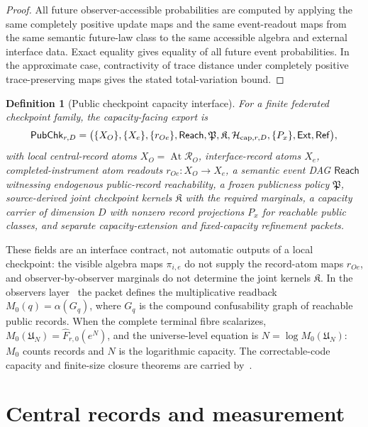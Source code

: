 \documentclass[11pt]{article}
\newtheorem{definition}[theorem]{Definition}
\theoremstyle{remark}
\theoremstyle{plain}
\begin{document}
\begin{proof}
All future observer-accessible probabilities are computed by applying the same completely
positive update maps and the same event-readout maps from the same semantic future-law class to the
same accessible algebra and external interface data. Exact equality gives equality of all future event probabilities. In the
approximate case, contractivity of trace distance under completely positive trace-preserving maps
gives the stated total-variation bound.
\end{proof}

\begin{definition}[Public checkpoint capacity interface]
\label{def:public-checkpoint-capacity-interface}
For a finite federated checkpoint family, the capacity-facing export is
\[
\mathsf{PubChk}_{r,D}=
\bigl(
\{X_O\},\{X_e\},\{r_{Oe}\},
\mathsf{Reach},\mathfrak P,\mathfrak K,
\mathcal H_{{\rm cap},r,D},\{P_x\},
\mathsf{Ext},\mathsf{Ref}
\bigr),
\]
with local central-record atoms \(X_O=\operatorname{At}\mathcal R_O\),
interface-record atoms \(X_e\), completed-instrument atom readouts
\(r_{Oe}:X_O\to X_e\), a semantic event DAG \(\mathsf{Reach}\) witnessing
endogenous public-record reachability, a frozen publicness policy
\(\mathfrak P\), source-derived joint checkpoint kernels \(\mathfrak K\) with
the required marginals, a capacity carrier of dimension \(D\) with nonzero
record projections \(P_x\) for reachable public classes, and separate
capacity-extension and fixed-capacity refinement packets.
\end{definition}

These fields are an interface contract, not automatic outputs of a local
checkpoint: the visible algebra maps \(\pi_{i,e}\) do not supply the
record-atom maps \(r_{Oe}\), and observer-by-observer marginals do not
determine the joint kernels \(\mathfrak K\). In the observers
layer~\cite{ophobservers} the packet defines the multiplicative readback
\(M_0(q)=\alpha(G_q)\), where \(G_q\) is the compound confusability graph of
reachable public records. When the complete terminal fibre scalarizes,
\(M_0(\mathfrak U_N)=\widehat F_{r,0}(e^N)\), and the universe-level equation
is \(N=\log M_0(\mathfrak U_N)\): \(M_0\) counts records and \(N\) is the
logarithmic capacity. The correctable-code capacity and finite-size closure
theorems are carried by~\cite{ophsynthesis}.

\section{Central records and measurement}
\label{sec:central-records}
\end{document}
